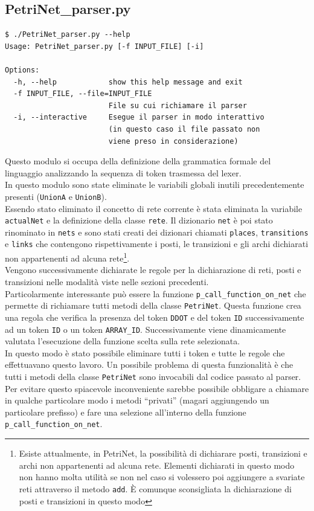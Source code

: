 \documentclass[italian,12pt]{book}
\begin{document}
\subsection{PetriNet\_parser.py}
\begin{verbatim}
$ ./PetriNet_parser.py --help
Usage: PetriNet_parser.py [-f INPUT_FILE] [-i] 

Options:
  -h, --help            show this help message and exit
  -f INPUT_FILE, --file=INPUT_FILE
                        File su cui richiamare il parser
  -i, --interactive     Esegue il parser in modo interattivo 
                        (in questo caso il file passato non 
                        viene preso in considerazione)
\end{verbatim}
Questo modulo si occupa della definizione della grammatica formale del linguaggio analizzando la sequenza di token trasmessa del lexer.\\
In questo modulo sono state eliminate le variabili globali inutili precedentemente presenti ({\tt UnionA} e {\tt UnionB}).\\
Essendo stato eliminato il concetto di rete corrente è stata eliminata la variabile {\tt actualNet} e la definizione della classe {\tt rete}. Il dizionario {\tt net} è poi stato rinominato in {\tt nets} e sono stati creati dei dizionari chiamati {\tt places}, {\tt transitions} e {\tt links} che contengono rispettivamente i posti, le transizioni e gli archi dichiarati non appartenenti ad alcuna rete\footnote{Esiste attualmente, in PetriNet, la possibilità di dichiarare posti, transizioni e archi non appartenenti ad alcuna rete. Elementi dichiarati in questo modo non hanno molta utilità se non nel caso si volessero poi aggiungere a svariate reti attraverso il metodo {\tt  add}. È comunque sconsigliata la dichiarazione di posti e transizioni in questo modo}.\\
Vengono successivamente dichiarate le regole per la dichiarazione di reti, posti e transizioni nelle modalità viste nelle sezioni precedenti.\\
Particolarmente interessante può essere la funzione {\tt p\_call\_function\_on\_net} che permette di richiamare tutti metodi della classe {\tt PetriNet}. Questa funzione crea una regola che verifica la presenza del token {\tt DDOT} e del token {\tt ID} successivamente ad un token {\tt ID} o un token {\tt ARRAY\_ID}. Successivamente viene dinamicamente valutata l'esecuzione della funzione scelta sulla rete selezionata. \\
In questo modo è stato possibile eliminare tutti i token e tutte le regole che effettuavano questo lavoro. Un possibile problema di questa funzionalità è che tutti i metodi della classe {\tt PetriNet} sono invocabili dal codice passato al parser. Per evitare questo spiacevole inconveniente sarebbe possibile obbligare a chiamare in qualche particolare modo i metodi ``privati'' (magari aggiungendo un particolare prefisso) e fare una selezione all'interno della funzione {\tt p\_call\_function\_on\_net}.\\
\end{document}
